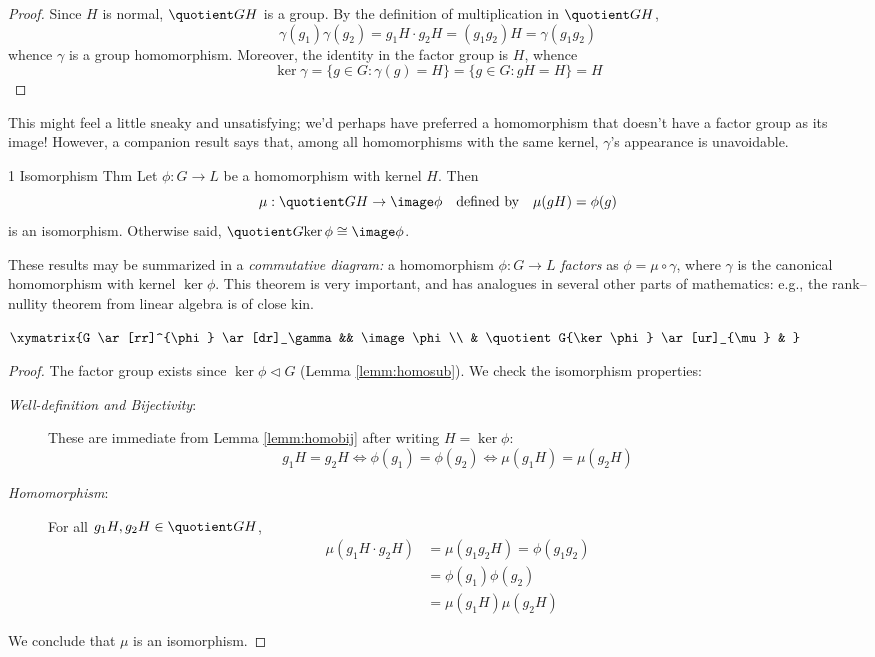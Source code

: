 \begin{proof}
	Since $H$ is normal, $\quotient GH$ is a group. By the definition of multiplication in $\quotient GH$,
	\[
		\gamma(g_1)\gamma(g_2)
		=g_1H\cdot g_2H
		=(g_1g_2)H
		=\gamma(g_1g_2)
	\]
	whence $\gamma$ is a group homomorphism. Moreover, the identity in the factor group is $H$, whence
	\[
		\ker\gamma=\{g\in G:\gamma(g)=H\} 
		=\{g\in G:gH=H\}=H
		\tag*{\qedhere}
	\]
\end{proof}

This might feel a little sneaky and unsatisfying; we'd perhaps have preferred a homomorphism that doesn't have a factor group as its image! However, a companion result says that, among all homomorphisms with the same kernel, $\gamma$'s appearance is unavoidable.

\begin{thm}{1\st{} Isomorphism Thm}{}
	Let $\phi:G\to L$ be a homomorphism with kernel $H$. Then
	\[
		\mu:\quotient GH\to\image\phi
		\quad \text{defined by}\quad 
		\mu(gH)=\phi(g)
	\]
	is an isomorphism. Otherwise said, $\quotient G{\ker\phi}\cong\image\phi$.
\end{thm}


\begin{minipage}[t]{0.69\linewidth}\vspace{-5pt}
	These results may be summarized in a \emph{commutative diagram:} a homomorphism $\phi:G\to L$ \emph{factors} as $\phi=\mu\circ\gamma$, where $\gamma$ is the canonical homomorphism with kernel $\ker\phi$. This theorem is very important, and has analogues in several other parts of mathematics: e.g., the rank--nullity theorem from linear algebra is of close kin.
\end{minipage}
\hfill
\begin{minipage}[t]{0.3\linewidth}\vspace{-5pt}
	\flushright$\xymatrix{%
		G \ar[rr]^{\phi} \ar[dr]_\gamma && \image\phi\\
		& \quotient G{\ker\phi} \ar[ur]_{\mu} &
	}$
\end{minipage}



\begin{proof}
	The factor group exists since $\ker\phi\triangleleft G$ (Lemma \ref{lemm:homosub}). We check the isomorphism properties:
  \begin{description}
		\item[\normalfont\emph{Well-definition and Bijectivity}:] These are immediate from Lemma \ref{lemm:homobij} after writing $H=\ker\phi$:
		\[
			g_1H=g_2H
			\iff \phi(g_1)=\phi(g_2)
			\iff \mu(g_1H)=\mu(g_2H)
		\]
		\item[\normalfont\emph{Homomorphism}:] For all $g_1H,g_2H\in\quotient GH$,
		\begin{align*}
			\mu(g_1H\cdot g_2H)
			&=\mu(g_1g_2H)=\phi(g_1g_2)
				\tag{definition of $\mu$}\\ 
				&=\phi(g_1)\phi(g_2)
				\tag{$\phi$ is a homomorphism}\\
			&=\mu(g_1H)\mu(g_2H)
		\end{align*}
  \end{description}
	We conclude that $\mu$ is an isomorphism.
\end{proof}


